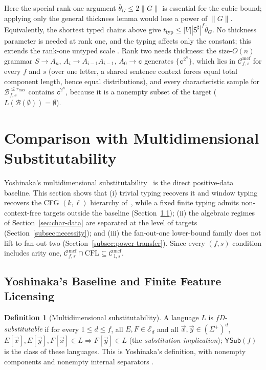 \documentclass[11pt]{article}
\numberwithin{equation}{section}
\theoremstyle{plain}
\theoremstyle{definition}
\newtheorem{definition}[theorem]{Definition}
\theoremstyle{remark}
\newcommand{\Cmcf}[2]{\mathcal{C}^{\mathrm{mcf}}_{#1,#2}}
\newcommand{\tuple}[1]{\vec{#1}}
\newcommand{\YSub}[1]{\mathsf{YSub}(#1)}
\begin{document}
Here the special rank-one argument $\bar\theta_G\le2\|G\|$ is
essential for the cubic bound; applying only the general thickness lemma
would lose a power of $\|G\|$.  Equivalently, the shortest typed chains
above give $t_{\mathrm{typ}}\le |V||\mathsf S^\sharp|^f\bar\theta_G$.
No thickness parameter is needed at rank one, and the typing affects only the
constant; this extends the rank-one untyped scale
\cite[Lemma~7]{Yoshinaka2011}.  Rank two needs thickness: the size-$O(n)$
grammar $S\to A_n$, $A_i\to A_{i-1}A_{i-1}$, $A_0\to\mathtt c$ generates
$\{\mathtt c^{2^n}\}$, which lies in $\Cmcf{f}{s}$ for every $f$ and $s$ (over one
letter, a shared sentence context forces equal total component length, hence equal
distributions), and every characteristic sample for $\mathcal B^{\le r_{\max}}_{f,s}$
contains $\mathtt c^{2^n}$, because it is a nonempty subset of the target
($L(\mathcal B(\emptyset))=\emptyset$).

\section{Comparison with Multidimensional Substitutability}
\label{sec:comparison}

Yoshinaka's multidimensional substitutability~\cite{Yoshinaka2009,Yoshinaka2011}
is the direct positive-data baseline.  This section shows that
(i) trivial typing recovers it and window typing recovers the CFG $(k,\ell)$
hierarchy of~\cite{Yoshinaka2008}, while a fixed finite typing admits
non-context-free targets outside the baseline
(Section~\ref{subsec:baseline}); (ii) the algebraic regimes of
Section~\ref{sec:char-data} are separated at the level of targets
(Section~\ref{subsec:necessity}); and (iii) the fan-out-one lower-bound family
does not lift to fan-out two (Section~\ref{subsec:power-transfer}).
Since every $(f,s)$ condition includes arity one,
$\Cmcf{f}{s}\cap\mathrm{CFL}\subseteq\Cmcf{1}{s}$.

\subsection{Yoshinaka's Baseline and Finite Feature Licensing}
\label{subsec:baseline}

\begin{definition}[Multidimensional substitutability]
\label{def:yoshinaka-pd-substitutability}
A language $L$ is \emph{$f$D-substitutable} if for every $1\le d\le f$, all
$E,F\in\mathcal E_d$ and all $\tuple x,\tuple y\in(\Sigma^+)^d$,
\(E[\tuple x],E[\tuple y],F[\tuple x]\in L\Rightarrow F[\tuple y]\in L\)
(the \emph{substitution implication}); $\YSub{f}$ is the class of these languages.
This is Yoshinaka's definition, with nonempty components and nonempty internal
separators \cite[Section~3.1 and footnote~3]{Yoshinaka2011}.
\end{definition}
\end{document}
